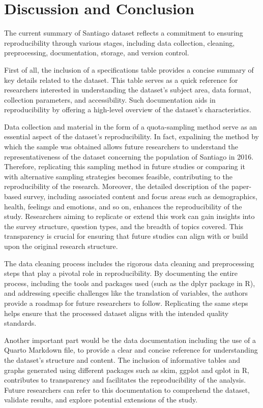 \documentclass[
11pt, %
oneside, %
english, %
singlespacing, %
]{macthesis} %
\begin{document}
\hypertarget{discussion-and-conclusion}{%
\section{Discussion and Conclusion}\label{discussion-and-conclusion}}

The current summary of Santiago dataset reflects a commitment to ensuring reproducibility through various stages, including data collection, cleaning, preprocessing, documentation, storage, and version control.

First of all, the inclusion of a specifications table provides a concise summary of key details related to the dataset. This table serves as a quick reference for researchers interested in understanding the dataset's subject area, data format, collection parameters, and accessibility. Such documentation aids in reproducibility by offering a high-level overview of the dataset's characteristics.

Data collection and material in the form of a quota-sampling method serve as an essential aspect of the dataset's reproducibility. In fact, expalining the method by which the sample was obtained allows future researchers to understand the representativeness of the dataset concerning the population of Santiago in 2016. Therefore, replicating this sampling method in future studies or comparing it with alternative sampling strategies becomes feasible, contributing to the reproducibility of the research. Moreover, the detailed description of the paper-based survey, including associated content and focus areas such as demographics, health, feelings and emotions, and so on, enhances the reproducibility of the study. Researchers aiming to replicate or extend this work can gain insights into the survey structure, question types, and the breadth of topics covered. This transparency is crucial for ensuring that future studies can align with or build upon the original research structure.

The data cleaning process includes the rigorous data cleaning and preprocessing steps that play a pivotal role in reproducibility. By documenting the entire process, including the tools and packages used (such as the dplyr package in R), and addressing specific challenges like the translation of variables, the authors provide a roadmap for future researchers to follow. Replicating the same steps helps ensure that the processed dataset aligns with the intended quality standards.

Another important part would be the data documentation including the use of a Quarto Markdown file, to provide a clear and concise reference for understanding the dataset's structure and content. The inclusion of informative tables and graphs generated using different packages such as skim, ggplot and qplot in R, contributes to transparency and facilitates the reproducibility of the analysis. Future researchers can refer to this documentation to comprehend the dataset, validate results, and explore potential extensions of the study.
\end{document}
